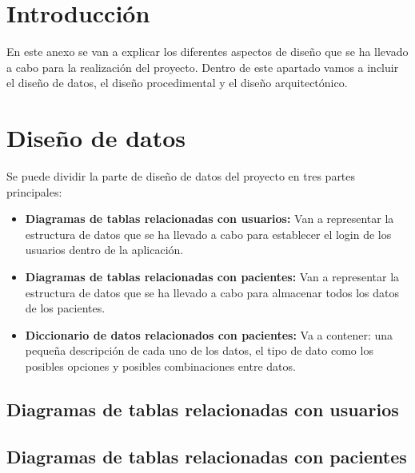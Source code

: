 
\section{Introducción}

En este anexo se van a explicar los diferentes aspectos de diseño que se ha llevado a cabo para la realización del proyecto. Dentro de este apartado vamos a incluir el diseño de datos, el diseño procedimental y el diseño arquitectónico.

\section{Diseño de datos}

Se puede dividir la parte de diseño de datos del proyecto en tres partes principales:
\begin{itemize}
    \item \textbf{Diagramas de tablas relacionadas con usuarios:} Van a representar la estructura de datos que se ha llevado a cabo para establecer el login de los usuarios dentro de la aplicación.
    \item \textbf{Diagramas de tablas relacionadas con pacientes:} Van a representar la estructura de datos que se ha llevado a cabo para almacenar todos los datos de los pacientes.
    \item \textbf{Diccionario de datos relacionados con pacientes:} Va a contener: una pequeña descripción de cada uno de los datos, el tipo de dato como los posibles opciones y posibles combinaciones entre datos.
\end{itemize}

\newpage

\subsection{Diagramas de tablas relacionadas con usuarios}



\newpage

\subsection{Diagramas de tablas relacionadas con pacientes}


